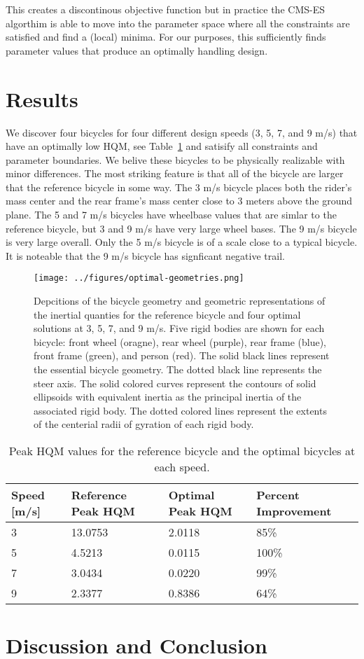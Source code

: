 \documentclass{bmd2019a}
\begin{document}
This creates a discontinous objective function but in practice the CMS-ES
algorthim is able to move into the parameter space where all the constraints
are satisfied and find a (local) minima. For our purposes, this sufficiently
finds parameter values that produce an optimally handling design.

\section{Results}
%
We discover four bicycles for four different design speeds (3, 5, 7, and 9 m/s)
that have an optimally low HQM, see Table~\ref{tab:hqm} and satisify all
constraints and parameter boundaries. We belive these bicycles to be physically
realizable with minor differences. The most striking feature is that all of the
bicycle are larger that the reference bicycle in some way.  The 3 m/s bicycle
places both the rider's mass center and the rear frame's mass center close to 3
meters above the ground plane. The 5 and 7 m/s bicycles have wheelbase values
that are simlar to the reference bicycle, but 3 and 9 m/s have very large wheel
bases. The 9 m/s bicycle is very large overall. Only the 5 m/s bicycle is of a
scale close to a typical bicycle. It is noteable that the 9 m/s bicycle has
signficant negative trail.
%
\begin{figure}
  \centering
  \texttt{[image: ../figures/optimal-geometries.png]}
  \caption{Depcitions of the bicycle geometry and geometric representations of
    the inertial quanties for the reference bicycle and four optimal solutions
    at 3, 5, 7, and 9 m/s. Five rigid bodies are shown for each bicycle: front
    wheel (oragne), rear wheel (purple), rear frame (blue), front frame
    (green), and person (red). The solid black lines represent the essential
    bicycle geometry. The dotted black line represents the steer axis. The
    solid colored curves represent the contours of solid ellipsoids with
    equivalent inertia as the principal inertia of the associated rigid body.
    The dotted colored lines represent the extents of the centerial radii of
    gyration of each rigid body.}
\end{figure}
%
\begin{table}
  \caption{Peak HQM values for the reference bicycle and the optimal bicycles
    at each speed.}
  \label{tab:hqm}
  \centering
  \begin{tabular}{llll}
    \toprule
    Speed [m/s] & Reference Peak HQM & Optimal Peak HQM & Percent Improvement \\
    \midrule
    3 & 13.0753 & 2.0118 & 85\% \\
    5 & 4.5213  & 0.0115 & 100\% \\
    7 & 3.0434  & 0.0220 &  99\% \\
    9 & 2.3377  & 0.8386 &  64\% \\
    \bottomrule
  \end{tabular}
\end{table}

\section{Discussion and Conclusion}
%



\end{document}
